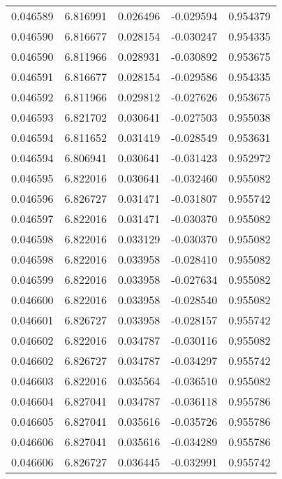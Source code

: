 \begin{tabular}{lrrrr}
0.046589    &  6.816991 &  0.026496 & -0.029594 &             0.954379 \\
0.046590    &  6.816677 &  0.028154 & -0.030247 &             0.954335 \\
0.046590    &  6.811966 &  0.028931 & -0.030892 &             0.953675 \\
0.046591    &  6.816677 &  0.028154 & -0.029586 &             0.954335 \\
0.046592    &  6.811966 &  0.029812 & -0.027626 &             0.953675 \\
0.046593    &  6.821702 &  0.030641 & -0.027503 &             0.955038 \\
0.046594    &  6.811652 &  0.031419 & -0.028549 &             0.953631 \\
0.046594    &  6.806941 &  0.030641 & -0.031423 &             0.952972 \\
0.046595    &  6.822016 &  0.030641 & -0.032460 &             0.955082 \\
0.046596    &  6.826727 &  0.031471 & -0.031807 &             0.955742 \\
0.046597    &  6.822016 &  0.031471 & -0.030370 &             0.955082 \\
0.046598    &  6.822016 &  0.033129 & -0.030370 &             0.955082 \\
0.046598    &  6.822016 &  0.033958 & -0.028410 &             0.955082 \\
0.046599    &  6.822016 &  0.033958 & -0.027634 &             0.955082 \\
0.046600    &  6.822016 &  0.033958 & -0.028540 &             0.955082 \\
0.046601    &  6.826727 &  0.033958 & -0.028157 &             0.955742 \\
0.046602    &  6.822016 &  0.034787 & -0.030116 &             0.955082 \\
0.046602    &  6.826727 &  0.034787 & -0.034297 &             0.955742 \\
0.046603    &  6.822016 &  0.035564 & -0.036510 &             0.955082 \\
0.046604    &  6.827041 &  0.034787 & -0.036118 &             0.955786 \\
0.046605    &  6.827041 &  0.035616 & -0.035726 &             0.955786 \\
0.046606    &  6.827041 &  0.035616 & -0.034289 &             0.955786 \\
0.046606    &  6.826727 &  0.036445 & -0.032991 &             0.955742 \\

\end{tabular}
